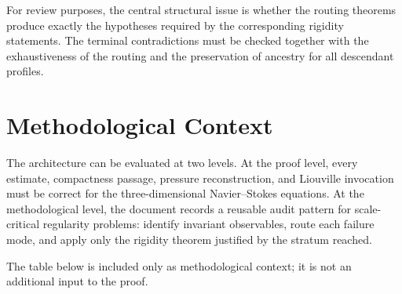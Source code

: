 \documentclass[11pt]{amsart}
\begin{document}
For review purposes, the central structural issue is whether the routing theorems produce exactly the hypotheses required by the corresponding rigidity statements.  The terminal contradictions must be checked together with the exhaustiveness of the routing and the preservation of ancestry for all descendant profiles.

\section{Methodological Context}

The architecture can be evaluated at two levels.  At the proof level, every estimate, compactness passage, pressure reconstruction, and Liouville invocation must be correct for the three-dimensional Navier--Stokes equations.  At the methodological level, the document records a reusable audit pattern for scale-critical regularity problems: identify invariant observables, route each failure mode, and apply only the rigidity theorem justified by the stratum reached.

The table below is included only as methodological context; it is not an additional input to the proof.
\end{document}
